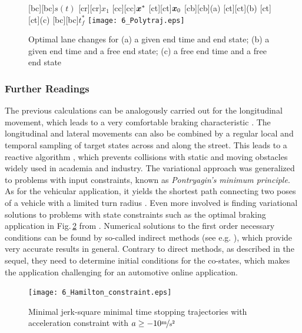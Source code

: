 \begin{figure}[h]
\centering
	[bc][bc]{$s(t)$}
	[cr][cr]{$x_1$}
	[cc][cc]{$\boldsymbol{x}^\ast$}
	[ct][ct]{$\boldsymbol{x}_0$}
	[cb][cb]{\scriptsize (a)}
	[ct][ct]{\scriptsize (b)}
	[ct][ct]{\scriptsize (c)}
	[bc][bc]{$t_f^\ast$}
	\centering
  	\texttt{[image: 6\_Polytraj.eps]}
  \caption{Optimal lane changes for (a) a given end time and end state; (b) a given end time and a free end state; (c) a free end time and a free end state}
    \label{fig:polytraj}
\end{figure}

\subsubsection{Further Readings}\label{S:57.3.1.3}

The previous calculations can be analogously carried out for the longitudinal movement, which leads to a very comfortable braking characteristic \cite{gutjahr2014automatic}. 
The longitudinal and lateral movements can also be combined by a regular local and temporal sampling of target states across and along the street. 
This leads to a reactive algorithm  \cite{wericra2010}, which prevents collisions with static and moving obstacles widely used in academia and industry.
The variational approach was generalized to problems with input constraints, known as \textit{Pontryagin's minimum principle}.
 As for the vehicular application, it yields the shortest path connecting two poses of a vehicle with a limited turn radius \cite{dubins1957cml,reeds1990optimal,boissonnat1994note}. %
Even more involved is finding variational solutions to problems with state constraints such as the optimal braking application in Fig.\,\ref{fig:poly_mit_unb} from \cite{werling2017optimale}.
Numerical solutions to the first order necessary conditions can be found by so-called indirect methods (see e.g.  \cite{Graichen2012}),
which provide very accurate results in general. Contrary to direct methods, as described in the sequel, they need to determine initial conditions for the co-states, which makes the application challenging for an automotive online application.





\begin{figure}[ht]
\centering

\renewcommand{\matlabtextA}{\normalsize }
	\def\ylabelV{$x_2$ in $\unitfrac{m}{s}$}
	\def\ylabelA{$x_3$ in $\unitfrac{m}{s^2}$}
	\def\xlabelT{$t$ in $\unit{s}$}
	\def\xlabelX{$x_1$ in $\unit{m}$}
	\centering
  	\texttt{[image: 6\_Hamilton\_constraint.eps]}
  \caption{Minimal jerk-square minimal time stopping trajectories with acceleration constraint with $a\geq -10 \unitfrac{m}{s^2}$}
    \label{fig:poly_mit_unb}
\end{figure}



